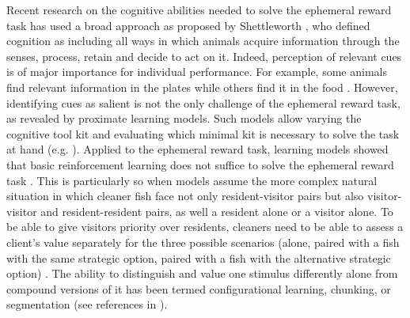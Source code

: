 \documentclass[]{rsos}%
\begin{document}
Recent research on the cognitive abilities needed to solve the ephemeral
reward task has used a broad approach as proposed by Shettleworth
\citep{shettleworth_Cognition_2009}, who defined cognition as including
all ways in which animals acquire information
through the senses, process, retain and decide to act on it.
Indeed, perception of relevant cues is of major importance
for individual performance. For example, some animals find relevant
information in the plates \citep{wismer_Cuebased_2019} while others find
it in the food \citep{pretot_Comparative_2021, pretot_Comparing_2016}.
However, identifying cues as salient is not the only challenge
of the ephemeral reward task, as revealed by proximate learning models.
Such models allow varying the cognitive tool kit and evaluating
which minimal kit is necessary to solve
the task at hand (e.g. \citep{dubois_Model_2021}). Applied to the ephemeral
reward task, learning models showed that basic reinforcement learning does
not suffice to solve the ephemeral reward task \citep{prat_Modelling_2022, quinones_Reinforcement_2019}.
This is particularly so when models assume the more complex natural
situation in which cleaner fish face not only resident-visitor pairs but also
visitor-visitor and resident-resident pairs, as well a resident alone or
a visitor alone. To be able to give visitors priority over residents,
cleaners need to be able to assess a client's value separately for the
three possible scenarios (alone, paired with a fish with the
same strategic option, paired with a fish with the alternative strategic option)
\citep{quinones_Reinforcement_2019}. The ability to distinguish and value
one stimulus differently alone from compound versions of it has been termed
configurational learning, chunking,
or segmentation (see references in \citep{prat_Modelling_2022}).
\end{document}

